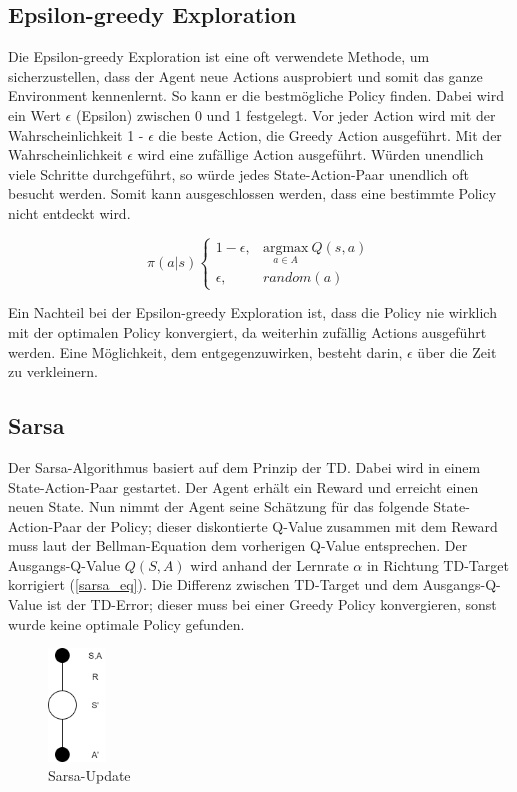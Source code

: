 \subsection{Epsilon-greedy Exploration}
Die Epsilon-greedy Exploration ist eine oft verwendete Methode, um sicherzustellen, dass der Agent neue Actions ausprobiert und somit das ganze Environment kennenlernt. So kann er die bestmögliche Policy finden. Dabei wird ein Wert $\epsilon$ (Epsilon) zwischen 0 und 1 festgelegt. Vor jeder Action wird mit der Wahrscheinlichkeit 1 - $\epsilon$ die beste Action, die Greedy Action ausgeführt. Mit der Wahrscheinlichkeit $\epsilon$ wird eine zufällige Action ausgeführt. Würden unendlich viele Schritte durchgeführt, so würde jedes State-Action-Paar unendlich oft besucht werden. Somit kann ausgeschlossen werden, dass eine bestimmte Policy nicht entdeckt wird.

\begin{equation}
   \pi(a|s)
\left\{\begin{matrix}
 1-\epsilon,&  \underset{a\in A} {\mathrm{argmax}} ~Q(s,a)\\ 
 \epsilon,& random(a)
\end{matrix}\right. 
\end{equation}

Ein Nachteil bei der Epsilon-greedy Exploration ist, dass die Policy nie wirklich mit der optimalen Policy konvergiert, da weiterhin zufällig Actions ausgeführt werden. Eine Möglichkeit, dem entgegenzuwirken, besteht darin, $\epsilon$ über die Zeit zu verkleinern.




\subsection{Sarsa}
Der Sarsa-Algorithmus \cite{rummery1994line} basiert auf dem Prinzip der TD. Dabei wird in einem State-Action-Paar gestartet. Der Agent erhält ein Reward und erreicht einen neuen State. Nun nimmt der Agent seine Schätzung für das folgende State-Action-Paar der Policy; dieser diskontierte Q-Value zusammen mit dem Reward muss laut der Bellman-Equation dem vorherigen Q-Value entsprechen. Der Ausgangs-Q-Value $Q\left(S,A\right)$ wird anhand der Lernrate $\alpha$ in Richtung TD-Target korrigiert (\ref{sarsa_eq}). Die Differenz zwischen TD-Target und dem Ausgangs-Q-Value ist der TD-Error; dieser muss bei einer Greedy Policy konvergieren, sonst wurde keine optimale Policy gefunden. 

 \begin{figure}[ht]
  \centering
  \includegraphics[height=3cm]{img/SARSA (1).png}
  \caption{Sarsa-Update}
      \label{fig:sarsa-update}
\end{figure} 

